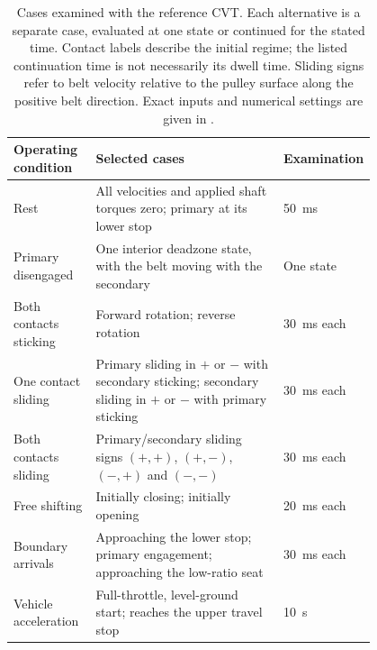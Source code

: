 \documentclass[11pt]{report}
\numberwithin{equation}{section}
\begin{document}
\begin{table}[H]
  \centering\small
  \setlength{\tabcolsep}{4pt}
  \renewcommand{\arraystretch}{1.12}
  \begin{tabular}{@{}
    >{\raggedright\arraybackslash}p{0.23\linewidth}
    >{\raggedright\arraybackslash}p{0.57\linewidth}
    >{\raggedright\arraybackslash}p{}@{}}
    \toprule
    Operating condition & Selected cases & Examination \\
    \midrule
    Rest & All velocities and applied shaft torques zero; primary at its lower stop
      & \SI{50}{ms} \\
    \addlinespace[3pt]
    Primary disengaged & One interior deadzone state, with the belt moving with the secondary
      & One state \\
    \addlinespace[3pt]
    Both contacts sticking & Forward rotation; reverse rotation
      & \SI{30}{ms} each \\
    \addlinespace[3pt]
    One contact sliding & Primary sliding in $+$ or $-$ with secondary sticking;
      secondary sliding in $+$ or $-$ with primary sticking
      & \SI{30}{ms} each \\
    \addlinespace[3pt]
    Both contacts sliding & Primary/secondary sliding signs
      $(+,+)$, $(+,-)$, $(-,+)$ and $(-,-)$
      & \SI{30}{ms} each \\
    \addlinespace[3pt]
    Free shifting & Initially closing; initially opening
      & \SI{20}{ms} each \\
    \addlinespace[3pt]
    Boundary arrivals & Approaching the lower stop; primary engagement;
      approaching the low-ratio seat
      & \SI{30}{ms} each \\
    \addlinespace[3pt]
    Vehicle acceleration & Full-throttle, level-ground start;
      reaches the upper travel stop
      & \SI{10}{s} \\
    \bottomrule
  \end{tabular}
  \caption{Cases examined with the reference CVT. Each alternative is a separate case, evaluated at one state or continued for the stated time. Contact labels describe the initial regime; the listed continuation time is not necessarily its dwell time. Sliding signs refer to belt
  velocity relative to the pulley surface along the positive belt direction.
  Exact inputs and numerical settings are given in
  .}
  \label{tab:verification_operating_conditions}
\end{table}
\end{document}
